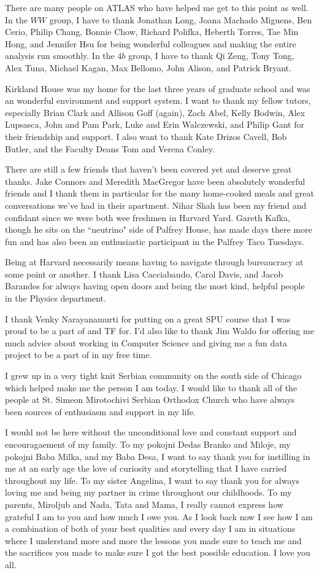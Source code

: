 There are many people on ATLAS who have helped me get to this point as well. In the $WW$ group, I have to thank Jonathan Long, Joana Machado Miguens, Ben Cerio, Philip Chang, Bonnie Chow, Richard Polifka, Heberth Torres, Tae Min Hong, and Jennifer Hsu for being wonderful colleagues and making the entire analysis run smoothly. In the $4b$ group, I have to thank Qi Zeng, Tony Tong, Alex Tuna, Michael Kagan, Max Bellomo, John Alison, and Patrick Bryant. 

Kirkland House was my home for the last three years of graduate school and was an wonderful environment and support system. I want to thank my fellow tutors, especially Brian Clark and Allison Goff (again), Zach Abel, Kelly Bodwin, Alex Lupsasca, John and Pam Park, Luke and Erin Walczewski, and Philip Gant for their friendship and support. I also want to thank Kate Drizos Cavell, Bob Butler, and the Faculty Deans Tom and Verena Conley.

There are still a few friends that haven't been covered yet and deserve great thanks. Jake Connors and Meredith MacGregor have been absolutely wonderful friends and I thank them in particular for the many home-cooked meals and great conversations we've had in their apartment. Nihar Shah has been my friend and confidant since we were both wee freshmen in Harvard Yard. Gareth Kafka, though he sits on the ``neutrino" side of Palfrey House, has made days there more fun and has also been an enthusiastic participant in the Palfrey Taco Tuesdays.  

Being at Harvard necessarily means having to navigate through bureaucracy at some point or another. I thank Lisa Cacciabaudo, Carol Davis, and Jacob Barandes for always having open doors and being the most kind, helpful people in the Physics department. 

I thank Venky Narayanamurti for putting on a great SPU course that I was proud to be a part of and TF for. I'd also like to thank Jim Waldo for offering me much advice about working in Computer Science and giving me a fun data project to be a part of in my free time. 

I grew up in a very tight knit Serbian community on the south side of Chicago which helped make me the person I am today. I would like to thank all of the people at St. Simeon Mirotochivi Serbian Orthodox Church who have always been sources of enthusiasm and support in my life. 

I would not be here without the unconditional love and constant support and encouragaement of my family. To my pokojni Dedas Branko and Miloje, my pokojni Baba Milka, and my Baba Desa, I want to say thank you for instilling in me at an early age the love of curiosity and storytelling that I have carried throughout my life. To my sister Angelina, I want to say thank you for always loving me and being my partner in crime throughout our childhoods. To my parents, Miroljub and Nada, Tata and Mama, I really cannot express how grateful I am to you and how much I owe you. As I look back now I see how I am a combination of both of your best qualities and every day I am in situations where I understand more and more the lessons you made sure to teach me and the sacrifices you made to make sure I got the best possible education. I love you all. 

